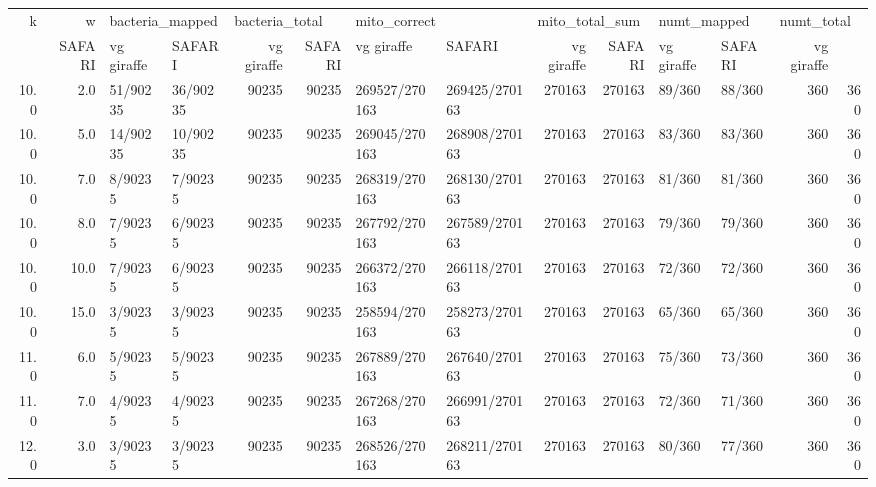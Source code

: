 \begin{tabular}{rrllrrllrrllrr}
\toprule
   k &    w & \multicolumn{2}{l}{bacteria_mapped} & \multicolumn{2}{l}{bacteria_total} & \multicolumn{2}{l}{mito_correct} & \multicolumn{2}{l}{mito_total_sum} & \multicolumn{2}{l}{numt_mapped} & \multicolumn{2}{l}{numt_total} \\
     &          SAFARI & vg giraffe &         SAFARI & vg giraffe &        SAFARI &    vg giraffe &         SAFARI & vg giraffe &      SAFARI & vg giraffe &     SAFARI & vg giraffe \\
\midrule
10.0 &  2.0 &        51/90235 &   36/90235 &          90235 &      90235 & 269527/270163 & 269425/270163 &         270163 &     270163 &      89/360 &     88/360 &        360 &        360 \\
10.0 &  5.0 &        14/90235 &   10/90235 &          90235 &      90235 & 269045/270163 & 268908/270163 &         270163 &     270163 &      83/360 &     83/360 &        360 &        360 \\
10.0 &  7.0 &         8/90235 &    7/90235 &          90235 &      90235 & 268319/270163 & 268130/270163 &         270163 &     270163 &      81/360 &     81/360 &        360 &        360 \\
10.0 &  8.0 &         7/90235 &    6/90235 &          90235 &      90235 & 267792/270163 & 267589/270163 &         270163 &     270163 &      79/360 &     79/360 &        360 &        360 \\
10.0 & 10.0 &         7/90235 &    6/90235 &          90235 &      90235 & 266372/270163 & 266118/270163 &         270163 &     270163 &      72/360 &     72/360 &        360 &        360 \\
10.0 & 15.0 &         3/90235 &    3/90235 &          90235 &      90235 & 258594/270163 & 258273/270163 &         270163 &     270163 &      65/360 &     65/360 &        360 &        360 \\
11.0 &  6.0 &         5/90235 &    5/90235 &          90235 &      90235 & 267889/270163 & 267640/270163 &         270163 &     270163 &      75/360 &     73/360 &        360 &        360 \\
11.0 &  7.0 &         4/90235 &    4/90235 &          90235 &      90235 & 267268/270163 & 266991/270163 &         270163 &     270163 &      72/360 &     71/360 &        360 &        360 \\
12.0 &  3.0 &         3/90235 &    3/90235 &          90235 &      90235 & 268526/270163 & 268211/270163 &         270163 &     270163 &      80/360 &     77/360 &        360 &        360 \\

\end{tabular}
